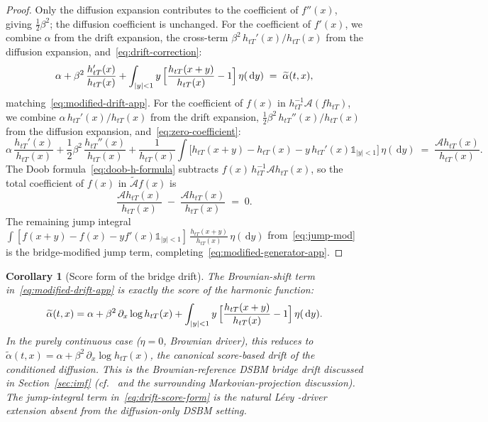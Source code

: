 \documentclass{article}
\newtheorem{coro}[thm]{Corollary}
\newcommand{\levy}{{L\'evy }}
\def\1{\mathds{1}}
\def\d{\,\mathrm{d}}
\def\half{\frac{1}{2}}
\theoremstyle{definition}
\begin{document}
\begin{proof}
Only the diffusion expansion contributes to the coefficient of $f''(x)$, giving $\half\beta^2$; the diffusion coefficient is unchanged. For the coefficient of $f'(x)$, we combine $\alpha$ from the drift expansion, the cross-term $\beta^2\,h_{tT}'(x)/h_{tT}(x)$ from the diffusion expansion, and~\eqref{eq:drift-correction}:
    \begin{equation*}
      \alpha + \beta^2\,\frac{h_{tT}'(x)}{h_{tT}(x)} + \int_{|y|<1} y\,\Bigl[\frac{h_{tT}(x+y)}{h_{tT}(x)} - 1\Bigr]\,\eta(\d y) \;=\; \widetilde{\alpha}(t,x),
    \end{equation*}
    matching~\eqref{eq:modified-drift-app}. For the coefficient of $f(x)$ in $h_{tT}^{-1}\mathcal{A}(f h_{tT})$, we combine $\alpha\,h_{tT}'(x)/h_{tT}(x)$ from the drift expansion, $\half\beta^2\,h_{tT}''(x)/h_{tT}(x)$ from the diffusion expansion, and~\eqref{eq:zero-coefficient}:
    \begin{equation*}
      \alpha\,\frac{h_{tT}'(x)}{h_{tT}(x)}
      + \half\beta^2\,\frac{h_{tT}''(x)}{h_{tT}(x)}
      + \frac{1}{h_{tT}(x)}\int \bigl[h_{tT}(x+y) - h_{tT}(x) - y\,h_{tT}'(x)\1_{|y|<1}\bigr]\,\eta(\d y)
      \;=\; \frac{\mathcal{A}h_{tT}(x)}{h_{tT}(x)}.
    \end{equation*}
    The Doob formula~\eqref{eq:doob-h-formula} subtracts $f(x)\,h_{tT}^{-1}\mathcal{A}h_{tT}(x)$, so the total coefficient of $f(x)$ in $\widetilde{\mathcal{A}}f(x)$ is
    \begin{equation*}
      \frac{\mathcal{A}h_{tT}(x)}{h_{tT}(x)} \;-\; \frac{\mathcal{A}h_{tT}(x)}{h_{tT}(x)} \;=\; 0.
    \end{equation*}
The remaining jump integral $\int [f(x+y) - f(x) - yf'(x)\1_{|y|<1}]\,\frac{h_{tT}(x+y)}{h_{tT}(x)}\,\eta(\d y)$ from~\eqref{eq:jump-mod} is the bridge-modified jump term, completing~\eqref{eq:modified-generator-app}.
\end{proof}

\begin{coro}[Score form of the bridge drift]
\label{cor:score-drift}
The Brownian-shift term in~\eqref{eq:modified-drift-app} is exactly the score of the harmonic function:
\begin{equation}\label{eq:drift-score-form}
  \widetilde{\alpha}(t, x)
  = \alpha + \beta^2\,\partial_x \log h_{tT}(x)
    + \int_{|y|<1} y\,\Bigl[\frac{h_{tT}(x+y)}{h_{tT}(x)} - 1\Bigr]\,\eta(\d y).
\end{equation}
In the purely continuous case ($\eta = 0$, Brownian driver), this reduces to $\widetilde{\alpha}(t, x) = \alpha + \beta^2\,\partial_x \log h_{tT}(x)$, the canonical score-based drift of the conditioned diffusion. This is the Brownian-reference DSBM bridge drift discussed in Section~\ref{sec:imf} (cf.~\cite[Proposition~2]{shi2023diffusion} and the surrounding Markovian-projection discussion). The jump-integral term in~\eqref{eq:drift-score-form} is the natural \levy-driver extension absent from the diffusion-only DSBM setting.
\end{coro}
\end{document}
